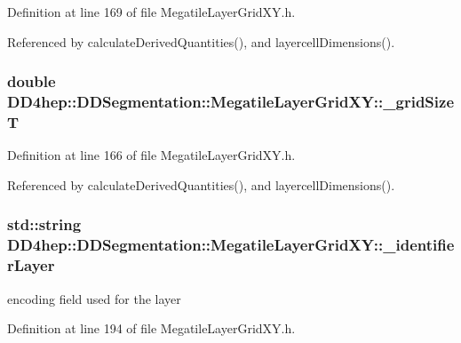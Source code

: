 Definition at line 169 of file MegatileLayerGridXY.h.

Referenced by calculateDerivedQuantities(), and layercellDimensions().\hypertarget{class_d_d4hep_1_1_d_d_segmentation_1_1_megatile_layer_grid_x_y_a73e8bf85c016511dedb6a892ef543163}{
\subsubsection[{\_\-gridSizeT}]{\setlength{\rightskip}{0pt plus 5cm}double {\bf DD4hep::DDSegmentation::MegatileLayerGridXY::\_\-gridSizeT}}}
\label{class_d_d4hep_1_1_d_d_segmentation_1_1_megatile_layer_grid_x_y_a73e8bf85c016511dedb6a892ef543163}


Definition at line 166 of file MegatileLayerGridXY.h.

Referenced by calculateDerivedQuantities(), and layercellDimensions().\hypertarget{class_d_d4hep_1_1_d_d_segmentation_1_1_megatile_layer_grid_x_y_a9bd28cb051873b31327867a7636774e4}{
\subsubsection[{\_\-identifierLayer}]{\setlength{\rightskip}{0pt plus 5cm}std::string {\bf DD4hep::DDSegmentation::MegatileLayerGridXY::\_\-identifierLayer}}}
\label{class_d_d4hep_1_1_d_d_segmentation_1_1_megatile_layer_grid_x_y_a9bd28cb051873b31327867a7636774e4}


encoding field used for the layer 

Definition at line 194 of file MegatileLayerGridXY.h.

